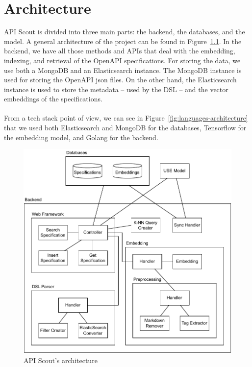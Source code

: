 \chapter{Architecture}\label{ch:architecture}
API Scout is divided into three main parts: the backend, the databases, and the model.
A general architecture of the project can be found in Figure~\ref{fig:backend-architecture}.
In the backend, we have all those methods and APIs that deal with the embedding, indexing, and retrieval of the OpenAPI specifications.
For storing the data, we use both a MongoDB and an Elasticsearch instance.
The MongoDB instance is used for storing the OpenAPI json files.
On the other hand, the Elasticsearch instance is used to store the metadata -- used by the DSL -- and the vector embeddings of the specifications. \\ \\
From a tech stack point of view, we can see in Figure~\ref{fig:languages-architecture} that we used both Elasticsearch and MongoDB for the databases, Tensorflow for the embedding model, and Golang for the backend.

\begin{figure}[h]
    \begin{center}
        \includegraphics[width=0.6\linewidth]{assets/pdf/architecture/general-architecture}
    \end{center}

    \caption{API Scout's architecture}
    \label{fig:backend-architecture}
\end{figure}


